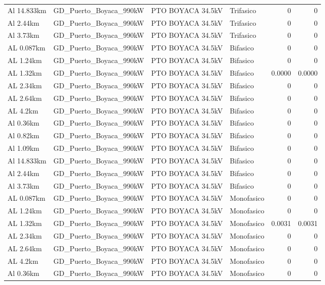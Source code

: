 \documentclass[11pt,a4paper]{article}
\begin{document}
\begin{longtable}{llllrr}
Al 14.833km & GD\_Puerto\_Boyaca\_990kW & PTO BOYACA 34.5kV & Trifasico & 0 & 0 \\
Al 2.44km & GD\_Puerto\_Boyaca\_990kW & PTO BOYACA 34.5kV & Trifasico & 0 & 0 \\
Al 3.73km & GD\_Puerto\_Boyaca\_990kW & PTO BOYACA 34.5kV & Trifasico & 0 & 0 \\
AL 0.087km & GD\_Puerto\_Boyaca\_990kW & PTO BOYACA 34.5kV & Bifasico & 0 & 0 \\
AL 1.24km & GD\_Puerto\_Boyaca\_990kW & PTO BOYACA 34.5kV & Bifasico & 0 & 0 \\
AL 1.32km & GD\_Puerto\_Boyaca\_990kW & PTO BOYACA 34.5kV & Bifasico & 0.0000 & 0.0000 \\
AL 2.34km & GD\_Puerto\_Boyaca\_990kW & PTO BOYACA 34.5kV & Bifasico & 0 & 0 \\
AL 2.64km & GD\_Puerto\_Boyaca\_990kW & PTO BOYACA 34.5kV & Bifasico & 0 & 0 \\
AL 4.2km & GD\_Puerto\_Boyaca\_990kW & PTO BOYACA 34.5kV & Bifasico & 0 & 0 \\
Al 0.36km & GD\_Puerto\_Boyaca\_990kW & PTO BOYACA 34.5kV & Bifasico & 0 & 0 \\
Al 0.82km & GD\_Puerto\_Boyaca\_990kW & PTO BOYACA 34.5kV & Bifasico & 0 & 0 \\
Al 1.09km & GD\_Puerto\_Boyaca\_990kW & PTO BOYACA 34.5kV & Bifasico & 0 & 0 \\
Al 14.833km & GD\_Puerto\_Boyaca\_990kW & PTO BOYACA 34.5kV & Bifasico & 0 & 0 \\
Al 2.44km & GD\_Puerto\_Boyaca\_990kW & PTO BOYACA 34.5kV & Bifasico & 0 & 0 \\
Al 3.73km & GD\_Puerto\_Boyaca\_990kW & PTO BOYACA 34.5kV & Bifasico & 0 & 0 \\
AL 0.087km & GD\_Puerto\_Boyaca\_990kW & PTO BOYACA 34.5kV & Monofasico & 0 & 0 \\
AL 1.24km & GD\_Puerto\_Boyaca\_990kW & PTO BOYACA 34.5kV & Monofasico & 0 & 0 \\
AL 1.32km & GD\_Puerto\_Boyaca\_990kW & PTO BOYACA 34.5kV & Monofasico & 0.0031 & 0.0031 \\
AL 2.34km & GD\_Puerto\_Boyaca\_990kW & PTO BOYACA 34.5kV & Monofasico & 0 & 0 \\
AL 2.64km & GD\_Puerto\_Boyaca\_990kW & PTO BOYACA 34.5kV & Monofasico & 0 & 0 \\
AL 4.2km & GD\_Puerto\_Boyaca\_990kW & PTO BOYACA 34.5kV & Monofasico & 0 & 0 \\
Al 0.36km & GD\_Puerto\_Boyaca\_990kW & PTO BOYACA 34.5kV & Monofasico & 0 & 0 \\

\end{longtable}
\end{document}
